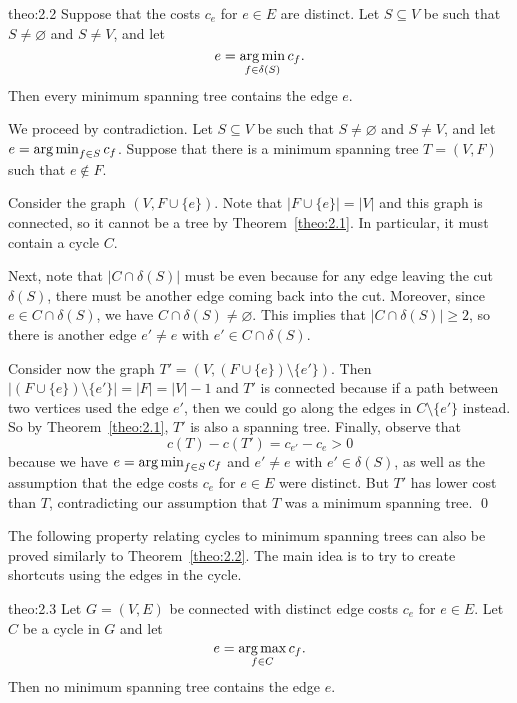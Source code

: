 \begin{theo}{theo:2.2}
    Suppose that the costs $c_e$ for $e \in E$ are distinct. 
    Let $S \subseteq V$ be such that $S \neq \varnothing$ and $S \neq V$, 
    and let 
    \[ e = \operatorname*{arg\,min}_{f \in \delta(S)} c_f. \] 
    Then every minimum spanning tree contains the edge $e$. 
\end{theo}\vspace{-0.25cm}
\begin{pf}
    We proceed by contradiction. Let $S \subseteq V$ be such that $S 
    \neq \varnothing$ and $S \neq V$, and let $e = \operatorname*{arg\,min}_{f\in S} c_f$. 
    Suppose that there is a minimum spanning tree $T = (V, F)$ such that 
    $e \notin F$. 

    Consider the graph $(V, F \cup \{e\})$. Note that $|F \cup \{e\}| = |V|$ 
    and this graph is connected, so it cannot be a tree by Theorem~\ref{theo:2.1}. 
    In particular, it must contain a cycle $C$. 

    Next, note that $|C \cap \delta(S)|$ must be even because for any 
    edge leaving the cut $\delta(S)$, there must be another edge coming back 
    into the cut. Moreover, since $e \in C \cap \delta(S)$, we have 
    $C \cap \delta(S) \neq \varnothing$. This implies that 
    $|C \cap \delta(S)| \geq 2$, so there is another edge $e' \neq e$ 
    with $e' \in C \cap \delta(S)$.

    Consider now the graph $T' = (V, (F \cup \{e\}) \setminus \{e'\})$. 
    Then $|(F \cup \{e\}) \setminus \{e'\}| = |F| = |V| - 1$ and $T'$ is 
    connected because if a path between two vertices used the edge $e'$, 
    then we could go along the edges in $C \setminus \{e'\}$ instead. 
    So by Theorem~\ref{theo:2.1}, $T'$ is also a spanning tree. 
    Finally, observe that 
    \[ c(T) - c(T') = c_{e'} - c_e > 0 \] 
    because we have $e = \operatorname*{arg\,min}_{f\in S} c_f$ and $e' \neq e$ with 
    $e' \in \delta(S)$, as well as the assumption that the edge 
    costs $c_e$ for $e \in E$ were distinct. But $T'$ has lower cost 
    than $T$, contradicting our assumption that $T$ was a minimum 
    spanning tree. \qed
\end{pf}\vspace{-0.25cm}

The following property relating cycles to minimum spanning trees 
can also be proved similarly to Theorem~\ref{theo:2.2}. 
The main idea is to try to create shortcuts using the edges in the cycle. 

\begin{theo}{theo:2.3}
    Let $G = (V, E)$ be connected with distinct edge costs 
    $c_e$ for $e \in E$. Let $C$ be a cycle in $G$ and let 
    \[ e = \operatorname*{arg\,max}_{f\in C} c_f. \] 
    Then no minimum spanning tree contains the edge $e$. 
\end{theo}

